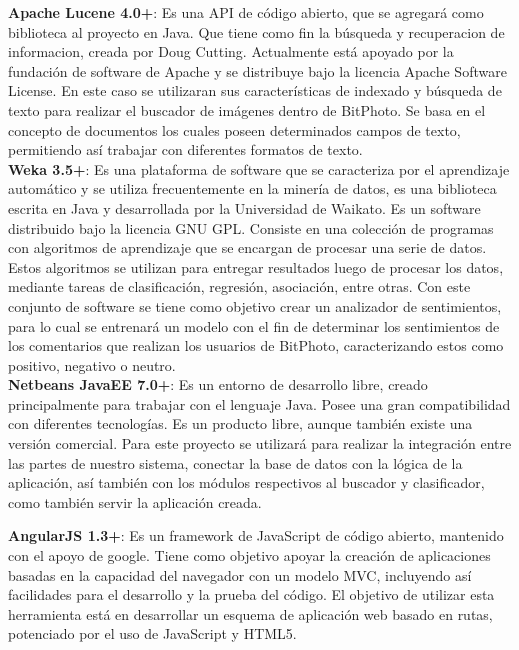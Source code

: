 \documentclass{memoria}
\begin{document}
\textbf{Apache Lucene 4.0+}: Es una API de código abierto, que se agregará como biblioteca al proyecto en Java. Que tiene como fin la búsqueda y recuperacion de informacion, creada por Doug Cutting. Actualmente está apoyado por la fundación de software de Apache y se distribuye bajo la licencia Apache Software License. En este caso se utilizaran sus características de indexado y búsqueda de texto para realizar el buscador de imágenes dentro de BitPhoto. Se basa en el concepto de documentos los cuales poseen determinados campos de texto, permitiendo así trabajar con diferentes formatos de texto.\\

\textbf{Weka 3.5+}: Es una plataforma de software que se caracteriza por el aprendizaje automático y se utiliza frecuentemente en la minería de datos, es una biblioteca escrita en Java y desarrollada por la Universidad de Waikato. Es un software distribuido bajo la licencia GNU GPL. Consiste en una colección de programas con algoritmos de aprendizaje que se encargan de procesar una serie de datos. Estos algoritmos se utilizan para entregar resultados luego de procesar los datos, mediante tareas de clasificación, regresión, asociación, entre otras. Con este conjunto de software se tiene como objetivo crear un analizador de sentimientos, para lo cual se entrenará un modelo con el fin de determinar los sentimientos de los comentarios que realizan los usuarios de BitPhoto, caracterizando estos como positivo, negativo o neutro.\\

\textbf{Netbeans JavaEE 7.0+}: Es un entorno de desarrollo libre, creado principalmente para trabajar con el lenguaje Java. Posee una gran compatibilidad con diferentes tecnologías. Es un producto libre, aunque también existe una versión comercial. Para este proyecto se utilizará para realizar la integración entre las partes de nuestro sistema, conectar la base de datos con la lógica de la aplicación, así también con los módulos respectivos al buscador y clasificador, como también servir la aplicación creada.\\


\textbf{AngularJS 1.3+}: Es un framework de JavaScript de código abierto, mantenido con el apoyo de google. Tiene como objetivo apoyar la creación de aplicaciones basadas en la capacidad del navegador con un modelo MVC, incluyendo así facilidades para el desarrollo y la prueba del código. El objetivo de utilizar esta herramienta está en desarrollar un esquema de aplicación web basado en rutas, potenciado por el uso de JavaScript y HTML5.\\
\end{document}
